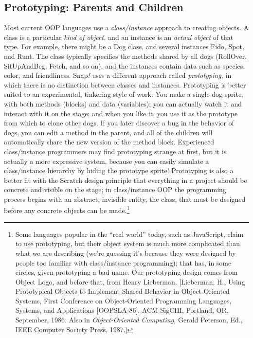 \subsection{\texorpdfstring{ Prototyping: Parents and
Children}{ Prototyping: Parents and Children}}\label{prototyping-parents-and-children}

Most current OOP languages use a \emph{class/instance} approach to
creating objects. A class is a particular \emph{kind of object,} and an
instance is an \emph{actual object} of that type. For example, there
might be a Dog class, and several instances Fido, Spot, and Runt. The
class typically specifies the methods shared by all dogs (RollOver,
SitUpAndBeg, Fetch, and so on), and the instances contain data such as
species, color, and friendliness. Snap\emph{!} uses a different approach
called \emph{prototyping,} in which there is no distinction between
classes and instances. Prototyping is better suited to an experimental,
tinkering style of work: You make a single dog sprite, with both methods
(blocks) and data (variables); you can actually watch it and interact
with it on the stage; and when you like it, you use it as the prototype
from which to clone other dogs. If you later discover a bug in the
behavior of dogs, you can edit a method in the parent, and all of the
children will automatically share the new version of the method block.
Experienced class/instance programmers may find prototyping strange at
first, but it is actually a more expressive system, because you can
easily simulate a class/instance hierarchy by hiding the prototype
sprite! Prototyping is also a better fit with the Scratch design
principle that everything in a project should be concrete and visible on
the stage; in class/instance OOP the programming process begins with an
abstract, invisible entity, the class, that must be designed before any
concrete objects can be made.\footnote{Some languages popular in the
  ``real world'' today, such as JavaScript, claim to use prototyping,
  but their object system is much more complicated than what we are
  describing (we're guessing it's because they were designed by people
  too familiar with class/instance programming); that has, in some
  circles, given prototyping a bad name. Our prototyping design comes
  from Object Logo, and before that, from Henry Lieberman. {[}Lieberman,
  H., Using Prototypical Objects to Implement Shared Behavior in
  Object-Oriented Systems, First Conference on Object-Oriented
  Programming Languages, Systems, and Applications {[}OOPSLA-86{]}, ACM
  SigCHI, Portland, OR, September, 1986. Also in \emph{Object-Oriented
  Computing,} Gerald Peterson, Ed., IEEE Computer Society Press,
  1987.{]}}

